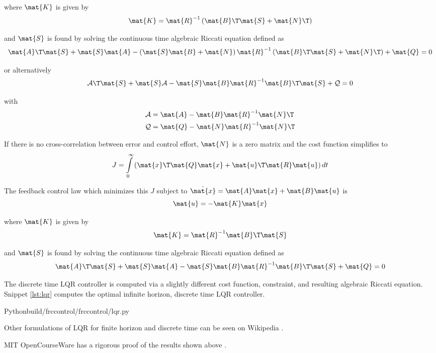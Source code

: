 where $\mat{K}$ is given by
\begin{equation*}
  \mat{K} = \mat{R}^{-1} \left(\mat{B}\T\mat{S} + \mat{N}\T\right)
\end{equation*}

and $\mat{S}$ is found by solving the continuous time algebraic Riccati equation
defined as
\begin{equation*}
  \mat{A}\T\mat{S} + \mat{S}\mat{A} - \left(\mat{S}\mat{B} +
    \mat{N}\right) \mat{R}^{-1} \left(\mat{B}\T\mat{S} + \mat{N}\T\right) +
    \mat{Q} = 0
\end{equation*}

or alternatively
\begin{equation*}
  \mathcal{A}\T\mat{S} + \mat{S}\mathcal{A} -
    \mat{S}\mat{B}\mat{R}^{-1}\mat{B}\T\mat{S} + \mathcal{Q} = 0
\end{equation*}

with
\begin{align*}
  \mathcal{A} &= \mat{A} - \mat{B}\mat{R}^{-1}\mat{N}\T \\
  \mathcal{Q} &= \mat{Q} - \mat{N}\mat{R}^{-1}\mat{N}\T
\end{align*}

If there is no cross-correlation between \gls{error} and \gls{control effort},
$\mat{N}$ is a zero matrix and the cost function simplifies to
\begin{equation*}
  J = \int\limits_0^\infty
    \left(\mat{x}\T\mat{Q}\mat{x} + \mat{u}\T\mat{R}\mat{u}\right) dt
\end{equation*}

The feedback \gls{control law} which minimizes this $J$ subject to
$\dot{\mat{x}} = \mat{A}\mat{x} + \mat{B}\mat{u}$ is
\begin{equation*}
  \mat{u} = -\mat{K}\mat{x}
\end{equation*}

where $\mat{K}$ is given by
\begin{equation*}
  \mat{K} = \mat{R}^{-1}\mat{B}\T\mat{S}
\end{equation*}

and $\mat{S}$ is found by solving the continuous time algebraic Riccati equation
defined as
\begin{equation*}
  \mat{A}\T\mat{S} + \mat{S}\mat{A} -
    \mat{S}\mat{B}\mat{R}^{-1}\mat{B}\T\mat{S} + \mat{Q} = 0
\end{equation*}

The discrete time LQR \gls{controller} is computed via a slightly different cost
function, constraint, and resulting algebraic Riccati equation. Snippet
\ref{lst:lqr} computes the optimal infinite horizon, discrete time LQR
\gls{controller}.
\begin{code}{Python}{build/frccontrol/frccontrol/lqr.py}
  \caption{Infinite horizon, discrete time LQR computation in Python}
  \label{lst:lqr}
\end{code}

Other formulations of LQR for finite horizon and discrete time can be seen on
Wikipedia \cite{bib:wiki_lqr}.

MIT OpenCourseWare has a rigorous proof of the results shown above
\cite{bib:lqr_derivs}.
